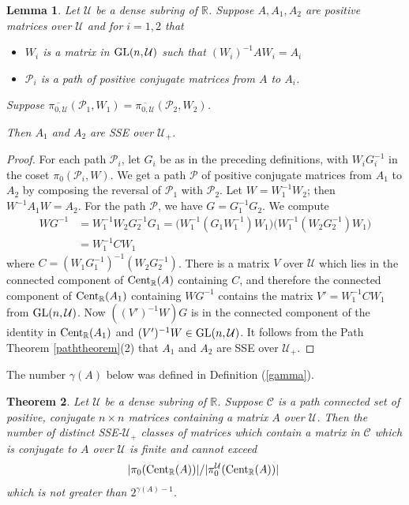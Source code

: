 \documentclass{amsart}
\newtheorem{theorem}{Theorem}[section]
\newtheorem{lemma}[theorem]{Lemma}
\theoremstyle{definition}
\theoremstyle{remark}
\newcommand{\za}{\textnormal{Cent}_{\mathbb R}(A)}
\numberwithin{equation}{section}
\begin{document}
{{\begin{lemma} 
Let $\mathcal U$ be a dense subring of $\mathbb R$. 
Suppose $A,A_1,A_2$ are positive matrices over 
$\mathcal U$ and for $i=1,2$ that 
\begin{itemize}
\item
  $W_i$  is a matrix in $  
\textnormal{GL}(n,\mathcal U)$ such that  
$(W_i)^{-1}AW_i=A_i$ 
\item 
$\mathcal P_i$ is a path of positive conjugate 
matrices from $A$ to $A_i$. 
\end{itemize}
Suppose 
$\overline{\pi_{0,\mathcal U}}(\mathcal P_1,W_1)=
\overline{\pi_{0,\mathcal U}}(\mathcal P_2,W_2)$. 

Then $A_1$ and $A_2$ are SSE over $\mathcal U_+$. 
\end{lemma}


\begin{proof} 
For each path $\mathcal P_i$, 
let $G_i$ be as  in the preceding definitions, 
with $W_iG_i^{-1}$ in the coset 
$\pi_0(\mathcal P_i,W)$.
We get a path 
$\mathcal P$ of positive conjugate matrices from 
$A_1$ to $A_2$ by composing the reversal of $\mathcal P_1$ 
with  $\mathcal P_2$. Let $W=W_1^{-1}W_2$; then 
$W^{-1}A_1W=A_2$.
For the path 
$\mathcal P$,  we  have  $G=G_1^{-1}G_2$. 
We compute 
\begin{align*} 
WG^{-1} &= W_1^{-1}W_2G_2^{-1}G_1 
 = \Big( W_1^{-1}
  (G_1W_1^{-1}) 
  W_1\Big)  
\Big(
W_1^{-1}(W_2G_2^{-1}) 
  W_1\Big)  
\\
&
= W_1^{-1}C  
  W_1
\end{align*}
where $C=
  (W_1G_1^{-1})^{-1} 
(W_2G_2^{-1})$. 
There is a matrix $V$ over $\mathcal U$ 
which lies in the connected component of 
$\za$ containing $C$, and therefore 
the connected component of 
$ \textnormal{Cent}_{\mathbb R} (A_{1}) $
containing  
$WG^{-1}$ contains the matrix 
$V'=W_1^{-1}C  
  W_1$ from 
$\textnormal{GL}(n,\mathcal U)$. 
Now $((V')^{-1}W)G$ is in the connected component of the 
identity 
in $ \textnormal{Cent}_{\mathbb R} (A_{1}) $
and 
$(V')^{-1}W\in \textnormal{GL}(n,\mathcal U)$. 
It follows from 
the Path Theorem \ref{paththeorem}(2) that $A_1$ and $A_2$ 
are SSE over $\mathcal U_+$.
\end{proof}

 The number 
$\gamma (A)$ below was defined in Definition (\ref{gamma}). 

\begin{theorem} \label{finitesseforu}
Let $\mathcal U$ be a dense subring of $\mathbb R$. 
Suppose 
$\mathcal C$ is a path connected set of positive, 
conjugate  $n\times n$ matrices containing a matrix $A$ 
over $\mathcal U$. 
Then the number of distinct SSE-$\mathcal U_+$ classes 
of matrices which contain a matrix in $\mathcal C$ 
which is conjugate to $A$ over $\mathcal U$  is finite and cannot exceed 
\[
|\pi_0(\za)|/|\pi_0^{\mathcal U}(\za)|\ 
\]
which is not greater than $2^{\gamma(A)-1}$.
 

\end{theorem}}}
\end{document}
